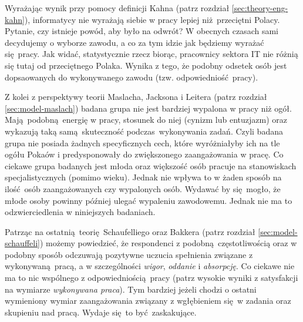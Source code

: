 Wyrażając wynik przy pomocy definicji Kahna (patrz rozdział \ref{sec:theory-eng-kahn}), informatycy nie wyrażają siebie w pracy lepiej niż przeciętni Polacy. Pytanie, czy istnieje powód, aby było na odwrót? W obecnych czasach sami decydujemy o wyborze zawodu, a co za tym idzie jak będziemy wyrażać się pracy. Jak widać, statystycznie rzecz biorąc, pracownicy sektora IT nie różnią się tutaj od przeciętnego Polaka. Wynika z tego, że podobny odsetek osób jest dopsaowanych do
wykonywanego zawodu (tzw. odpowiedniość pracy).

Z kolei z perspektywy teorii Maslacha, Jacksona i Leitera (patrz rozdział \ref{sec:model-maslach}) badana grupa nie jest bardziej wypalona w pracy niż ogół. Mają podobną energię w pracy, stosunek do niej (cynizm lub entuzjazm) oraz wykazują taką samą skuteczność podczas wykonywania zadań. Czyli badana grupa nie posiada żadnych specyficznych cech, które wyróżniałyby ich na tle ogółu Pokaów i predysponowały do zwiększonego zaangażowania w pracę. Co ciekawe grupa badanych
jest młoda oraz większość osób pracuje na stanowiskach specjalistycznych (pomimo wieku). Jednak nie wpływa to w żaden sposób na
ilość osób zaangażowanych czy wypalonych osób. Wydawać by się mogło, że młode osoby powinny później ulegać wypaleniu zawodowemu. Jednak nie ma to odzwierciedlenia w niniejszych badaniach.

Patrząc na ostatnią teorię Schaufelliego oraz Bakkera (patrz rozdział \ref{sec:model-schauffeli}) możemy powiedzieć, że respondenci z podobną częstotliwością oraz w podobny sposób odczuwają pozytywne uczucia spełnienia związane z wykonywaną pracą, a w szczególności \textit{wigor}, \textit{oddanie} i \textit{absorpcję}. Co ciekawe nie ma to nic wspólnego z odpowiedniością pracy (patrz wysokie wyniki z satysfakcji na wymiarze \textit{wykonywana praca}). Tym bardziej
jeżeli chodzi o ostatni wymieniony wymiar zaangażowania związany z wgłębieniem się w zadania oraz skupieniu nad pracą. Wydaje się to być zaskakujące.
